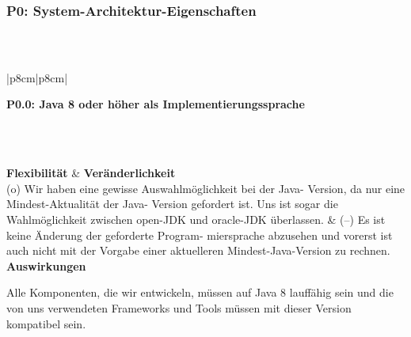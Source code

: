 \documentclass[enabledeprecatedfontcommands,fontsize=11pt,paper=a4,twoside]{scrartcl}
\newcounter{one}
\newcounter{two}[one]
\newcommand{\tone}{0\theone}
\newcommand{\two}{\stepcounter{two}0\thetwo}
\newcommand\s{\rule{0pt}{4ex}}
\begin{document}
\subsubsection*{\hypertarget{a}{P\tone}: System-Architektur-Eigenschaften} 
\begin{tabular}{|p{8cm}|p{8cm}|}
\end{tabular}\\
\begin{tabular}{|p{8cm}|p{8cm}|}
	\hline
	 { \parbox{16cm}{\textbf{\hypertarget{b}{P\tone.\two}: Java 8 oder höher als Implementierungssprache} }} \\  
	\hline\hline 
	\s\\ [1ex]
	\hline
	\textbf{Flexibilität}  & \textbf{Veränderlichkeit} \\ 
	(o) Wir haben eine gewisse Auswahlmöglichkeit bei der Java-
	Version, da nur eine Mindest-Aktualität der Java-
	Version gefordert ist. Uns ist sogar die Wahlmöglichkeit zwischen open-JDK und oracle-JDK überlassen. &
	(--) Es ist keine Änderung der geforderte Program-
	miersprache abzusehen und vorerst ist auch nicht mit
	der Vorgabe einer aktuelleren Mindest-Java-Version
	zu rechnen.
	\\ \hline
	 {\textbf{Auswirkungen}} \\ 
	 {\parbox{16cm}{Alle Komponenten, die wir entwickeln, müssen auf Java 8 lauffähig sein und die von uns verwendeten Frameworks und Tools müssen mit dieser Version kompatibel sein.} }\\ \hline
\end{tabular}
\\ \\ \\ \\ %
\end{document}
